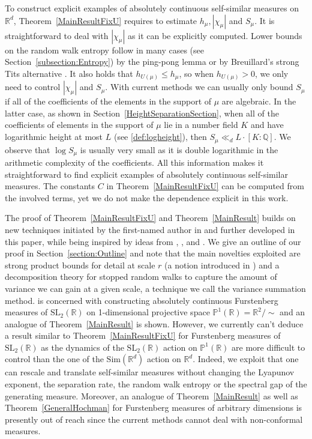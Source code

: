\documentclass[10pt, english,oneside,reqno]{amsart}
\theoremstyle{plain}
\theoremstyle{remark}
\numberwithin{equation}{section}
\numberwithin{figure}{section}
\newcommand{\Q}{\mathbb{Q}}
\newcommand{\R}{\mathbb{R}}
\begin{document}
    To construct explicit examples of absolutely continuous self-similar measures on $\R^d$, Theorem~\ref{MainResultFixU} requires to estimate $h_{\mu}, |\chi_{\mu}|$ and $S_{\mu}$. It is straightforward to deal with $|\chi_{\mu}|$ as it can be explicitly computed. Lower bounds on the random walk entropy follow in many cases (see Section~\ref{subsection:Entropy}) by the ping-pong lemma or by Breuillard's strong Tits alternative \cite{Breuillard2008}. It also holds that $h_{U(\mu)} \leq h_{\mu}$, so when $h_{U(\mu)} > 0$, we only need to control $|\chi_{\mu}|$ and $S_{\mu}$. With current methods we can usually only bound $S_{\mu}$ if all of the coefficients of the elements in the support of $\mu$ are algebraic. In the latter case, as shown in Section~\ref{HeightSeparationSection}, when all of the coefficients of elements in the support of $\mu$ lie in a number field $K$ and have logarithmic height at most $L$ (see \eqref{def:logheight}), then $S_{\mu} \ll_d L\cdot[K:\Q]$. We observe that $\log S_{\mu}$ is usually very small as it is double logarithmic in the arithmetic complexity of the coefficients. All this information makes it straightforward to find explicit examples of absolutely continuous self-similar measures. The constants $C$ in Theorem~\ref{MainResultFixU} can be computed from the involved terms, yet we do not make the dependence explicit in this work.

    The proof of Theorem~\ref{MainResultFixU} and Theorem~\ref{MainResult} builds on new techniques initiated by the first-named author in \cite{Kittle2023} and further developed in this paper, while being inspired by ideas from \cite{Hochman2014}, \cite{Hochman2017}, \cite{Varju2019} and \cite{Kittle2021}. We give an outline of our proof in Section~\ref{section:Outline} and note that the main novelties exploited are strong product bounds for detail at scale $r$ (a notion introduced in \cite{Kittle2021}) and a decomposition theory for stopped random walks to capture the amount of variance we can gain at a given scale, a technique we call the variance summation method. \cite{Kittle2023} is concerned with constructing absolutely continuous Furstenberg measures of $\mathrm{SL}_2(\R)$ on 1-dimensional projective space $\mathbb{P}^1(\R) = \R^2/\sim$ and an analogue of Theorem~\ref{MainResult} is shown. However, we currently can't deduce a result similar to Theorem~\ref{MainResultFixU} for Furstenberg measures of $\mathrm{SL}_2(\R)$ as the dynamics of the $\mathrm{SL}_2(\R)$ action on $\mathbb{P}^1(\R)$ are more difficult to control than the one of the $\mathrm{Sim}(\R^d)$ action on $\R^d$. Indeed, we exploit that one can rescale and translate self-similar measures without changing the Lyapunov exponent, the separation rate, the random walk entropy or the spectral gap of the generating measure. Moreover, an analogue of Theorem~\ref{MainResult} as well as Theorem~\ref{GeneralHochman} for Furstenberg measures of arbitrary dimensions is presently out of reach since the current methods cannot deal with non-conformal measures.
\end{document}
